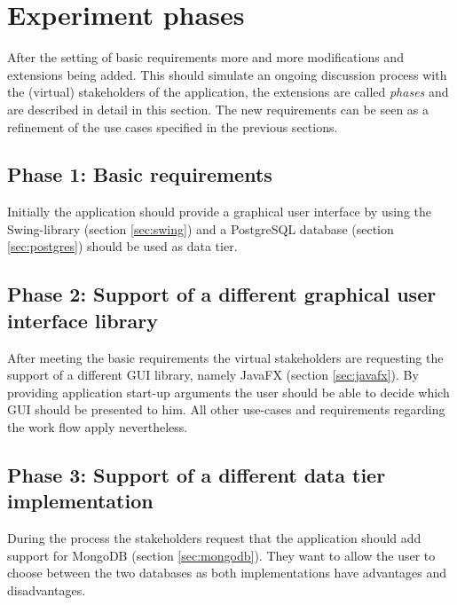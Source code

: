 \section{Experiment phases}
After the setting of basic requirements more and more modifications and extensions being added. This should simulate an ongoing discussion process with the (virtual) stakeholders of the application, the extensions are called \emph{phases} and are described in detail in this section. The new requirements can be seen as a refinement of the use cases specified in the previous sections.

\subsection{Phase 1: Basic requirements} 
Initially the application should provide a graphical user interface by using the Swing-library (section \ref{sec:swing}) and a PostgreSQL database (section \ref{sec:postgres}) should be used as data tier.

\subsection{Phase 2: Support of a different graphical user interface library}
After meeting the basic requirements the virtual stakeholders are requesting the support of a different GUI library, namely JavaFX (section \ref{sec:javafx}). By providing application start-up arguments the user should be able to decide which GUI should be presented to him. All other use-cases and requirements regarding the work flow apply nevertheless.

\subsection{Phase 3: Support of a different data tier implementation}
During the process the stakeholders request that the application should add support for MongoDB (section \ref{sec:mongodb}). They want to allow the user to choose between the two databases as both implementations have advantages and disadvantages. 


